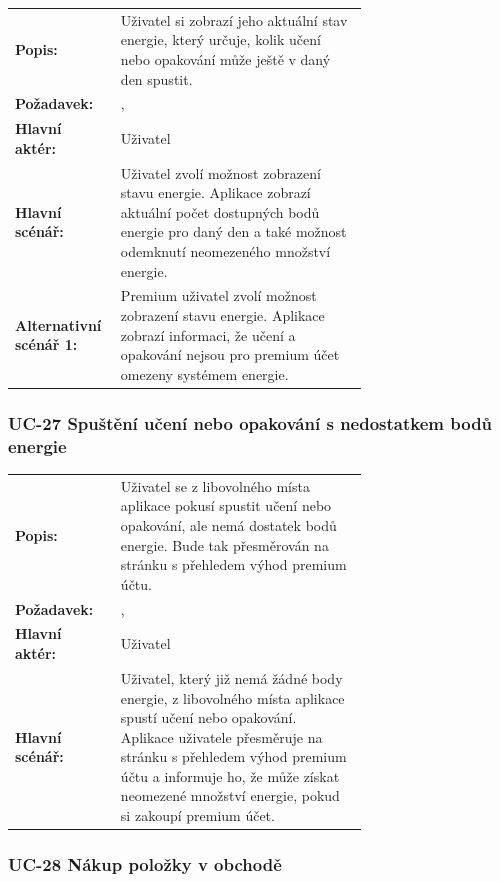 \begin{tabular}{lp{0.7\linewidth}}
  \textbf{Popis:} & Uživatel si zobrazí jeho aktuální stav energie, který určuje, kolik učení nebo opakování může ještě v daný den spustit. \\
  \textbf{Požadavek:} & \nameref{sec:fp-energy-status}, \nameref{sec:fp-subscription-system} \\
  \textbf{Hlavní aktér:} & Uživatel \\
  \textbf{Hlavní scénář:} & Uživatel zvolí možnost zobrazení stavu energie. Aplikace zobrazí aktuální počet dostupných bodů energie pro daný den a také možnost odemknutí neomezeného množství energie. \\
  \textbf{Alternativní scénář 1:} & Premium uživatel zvolí možnost zobrazení stavu energie. Aplikace zobrazí informaci, že učení a opakování nejsou pro premium účet omezeny systémem energie. \\
\end{tabular}

\subsubsection{UC-27 Spuštění učení nebo opakování s nedostatkem bodů energie}

\begin{tabular}{lp{0.7\linewidth}}
  \textbf{Popis:} & Uživatel se z libovolného místa aplikace pokusí spustit učení nebo opakování, ale nemá dostatek bodů energie. Bude tak přesměrován na stránku s přehledem výhod premium účtu. \\
  \textbf{Požadavek:} & \nameref{sec:fp-energy-status}, \nameref{sec:fp-subscription-system} \\
  \textbf{Hlavní aktér:} & Uživatel \\
  \textbf{Hlavní scénář:} & Uživatel, který již nemá žádné body energie, z libovolného místa aplikace spustí učení nebo opakování. Aplikace uživatele přesměruje na stránku s přehledem výhod premium účtu a informuje ho, že může získat neomezené množství energie, pokud si zakoupí premium účet. \\
\end{tabular}

\subsubsection{UC-28 Nákup položky v obchodě}

